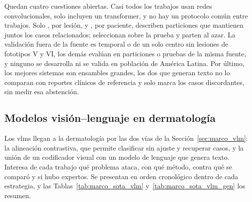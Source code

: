Quedan cuatro cuestiones abiertas. Casi todos los trabajos usan redes convolucionales, solo
\textcite{kim2025skinsavvy2} incluyen un transformer, y no hay un protocolo común entre trabajos. Solo
\textcite{gessert2020skin}, por lesión, y \textcite{liu2020deep}, por paciente, describen particiones que mantienen
juntos los casos relacionados; \textcite{yao2022single} seleccionan sobre la prueba y \textcite{khan2025ensemble}
parten al azar. La validación fuera de la fuente es temporal o de un solo centro sin lesiones de fototipos V y
VI, los demás evalúan en particiones o pruebas de la misma fuente, y ninguno se desarrolla ni se valida en
población de América Latina. Por último, los mejores sistemas son ensambles grandes, los dos que generan texto no lo
comparan con reportes clínicos de referencia y solo \textcite{khan2025ensemble} marca los casos discordantes, sin
medir esa abstención.

\FloatBarrier
\subsection{Modelos visión--lenguaje en dermatología}
\label{sec:estado_arte_vlm}

Los \glspl{vlm} llegan a la dermatología por las dos vías de la Sección~\ref{sec:marco_vlm}: la alineación
contrastiva, que permite clasificar sin ajuste y recuperar casos, y la unión de un codificador visual con un modelo
de lenguaje que genera texto. Interesa de cada trabajo qué problema ataca, con qué método, contra qué se comparó y si
hubo expertos. Se presentan en orden cronológico dentro de cada estrategia, y las
Tablas~\ref{tab:marco_sota_vlm} y~\ref{tab:marco_sota_vlm_gen} los resumen.

